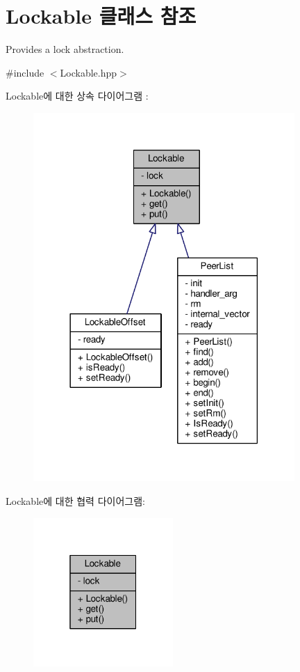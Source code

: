 \hypertarget{class_lockable}{}\section{Lockable 클래스 참조}
\label{class_lockable}


Provides a lock abstraction.  




{\ttfamily \#include $<$Lockable.\+hpp$>$}



Lockable에 대한 상속 다이어그램 \+: 
\nopagebreak
\begin{figure}[H]
\begin{center}
\leavevmode
\includegraphics[width=282pt]{class_lockable__inherit__graph}
\end{center}
\end{figure}


Lockable에 대한 협력 다이어그램\+:
\nopagebreak
\begin{figure}[H]
\begin{center}
\leavevmode
\includegraphics[width=151pt]{class_lockable__coll__graph}
\end{center}
\end{figure}
